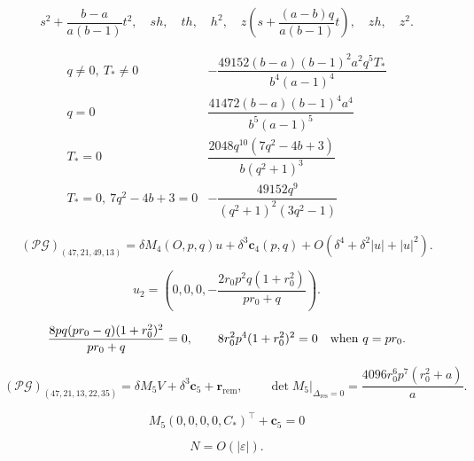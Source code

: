 \begin{equation}\label{supp:dil:quadratic-normal}
 s^2+\frac{b-a}{a(b-1)}t^2,\quad sh,\quad th,\quad h^2,\quad
 z\left(s+\frac{(a-b)q}{a(b-1)}t\right),\quad zh,\quad z^2.
\end{equation}

\begin{equation}\label{supp:dil:quadratic-pivots}
\begin{array}{c|c}
 q\ne0,\ T_*\ne0&
 -\dfrac{49152(b-a)(b-1)^2a^2q^5T_*}{b^4(a-1)^4}\\[1mm]
 q=0&\dfrac{41472(b-a)(b-1)^4a^4}{b^5(a-1)^5}\\[1mm]
 T_*=0&\dfrac{2048q^{10}(7q^2-4b+3)}{b(q^2+1)^3}\\[1mm]
 T_*=0,\ 7q^2-4b+3=0&
 -\dfrac{49152q^9}{(q^2+1)^2(3q^2-1)}
\end{array}
\end{equation}

\begin{equation}\label{supp:dil:middle-four}
 (\mathcal P\boldsymbol{\mathcal G})_{(47,21,49,13)}=\delta M_4(O,p,q)u+\delta^3\boldsymbol c_4(p,q)
           +O(\delta^4+\delta^2|u|+|u|^2).
\end{equation}

\begin{equation}\label{supp:dil:middle-centre}
 u_2=\left(0,0,0,-\frac{2r_0p^2q(1+r_0^2)}{pr_0+q}\right).
\end{equation}

\begin{equation}\label{supp:dil:middle-obstruction}
 \frac{8pq(pr_0-q)(1+r_0^2)^2}{pr_0+q}=0,\qquad
 8r_0^2p^4(1+r_0^2)^2=0\quad\hbox{when }q=pr_0.
\end{equation}

\begin{equation}\label{supp:dil:resonant-five}
 (\mathcal P\boldsymbol{\mathcal G})_{(47,21,13,22,35)}=\delta M_5V+\delta^3\boldsymbol c_5+\boldsymbol r_{\mathrm{rem}},\qquad
 \det M_5\big|_{\Delta_{\mathrm{res}}=0}
      =\frac{4096r_0^6p^7(r_0^2+a)}a.
\end{equation}

\begin{equation}\label{supp:dil:resonant-centre}
            M_5(0,0,0,0,C_*)^{\top}+\boldsymbol c_5=0
\end{equation}

\begin{equation}\label{supp:dil:normal-rate}
                            N=O(|\varepsilon|).
\end{equation}

